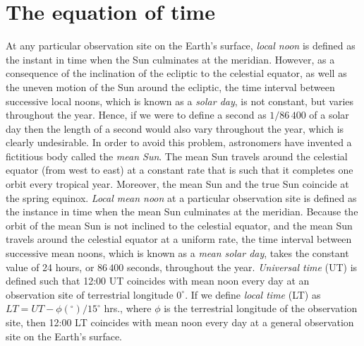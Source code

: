 \section{The equation of time}
At any particular observation site on the Earth's surface, {\em local noon}\/
is defined as the instant in time when the Sun culminates at the
meridian. However, as a consequence of the inclination of the
ecliptic to the celestial equator, as well as the uneven motion of the
Sun around the ecliptic, the time interval  between successive local noons, which
is known as a {\em solar day}, 
is not constant, but varies throughout the year. Hence, if we were to
define a second as $1/86\,400$ of a solar day then the length of a second
would also vary throughout the year, which is clearly undesirable. In
order to avoid this problem, astronomers have invented a fictitious
body called the {\em mean Sun}. The mean Sun travels around the
celestial equator (from west to east) at a constant
rate that is such that it completes one orbit every tropical year. Moreover,
the mean Sun and the true Sun coincide at the spring equinox. {\em Local mean noon}\/ at a particular observation
site is defined as the instance in time when the mean Sun culminates at
the meridian. Because the orbit of the mean Sun is not inclined to the
celestial equator, and the mean Sun travels  around the celestial equator at a uniform rate, the time
interval between successive mean noons, which is known as a
{\em mean solar day}, takes the constant value of 24 hours, or
$86\,400$ seconds, throughout the year. {\em Universal time}\/ (UT)
is defined such that 12:00  UT coincides with mean noon every day at
an observation site of terrestrial longitude $0^\circ$. If we define {\em local  time}\/
(LT)
as $LT = UT- \phi(^\circ)/15^\circ$ hrs., where $\phi$ is the terrestrial longitude
of the observation site, then 12:00  LT coincides with mean noon
every day at a general observation site on the Earth's surface.

